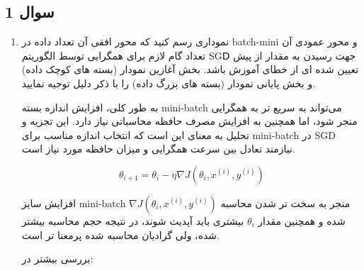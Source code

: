 \subsection{سوال 1}

\begin{enumerate}
	\item {
	      نموداری رسم کنید که محور افقی آن تعداد داده در batch-mini و محور عمودی آن تعداد گام لازم
	      برای همگرایی توسط الگوریتم SGⅮ جهت رسیدن به مقدار از پیش تعیین شده ای از خطای آموزش
	      باشد. بخش آغازین نمودار (بسته های کوچک داده) و بخش پایانی نمودار (بسته های بزرگ داده) را
	      با ذکر دلیل توجیه نمایید.

	      \begin{qsolve}[]
		      \begin{minipage}{0.5\textwidth}
			      به طور کلی، افزایش اندازه بسته mini-batch می‌تواند به سریع تر به همگرایی منجر شود،
			      اما همچنین به افزایش مصرف حافظه محاسباتی نیاز دارد.
			      این تجزیه و تحلیل به معنای این است که انتخاب اندازه مناسب برای mini-batch در SGD نیازمند تعادل بین سرعت همگرایی و میزان حافظه مورد نیاز است.

			      \[
				      \theta_{i+1} = \theta_i - \eta \nabla J(\theta_i, x^{(i)}, y^{(i)})
			      \]

			      افزایش سایز mini-batch منجر به سخت تر شدن محاسبه $\nabla J(\theta_i, x^{(i)}, y^{(i)})$ شده و همچنین مقدار $\theta_i$
			      بیشتری باید آپدیت شوند، در نتیجه حجم محاسبه بیشتر شده، ولی گرادیان محاسبه شده پرمعنا تر است.

			      بررسی بیشتر در: \cite{tsukada2023relationship}
		      \end{minipage}
		      \hspace*{2em}
		      \begin{minipage}{0.45\textwidth}
		      \end{minipage}
	      \end{qsolve}

}
\end{enumerate}
